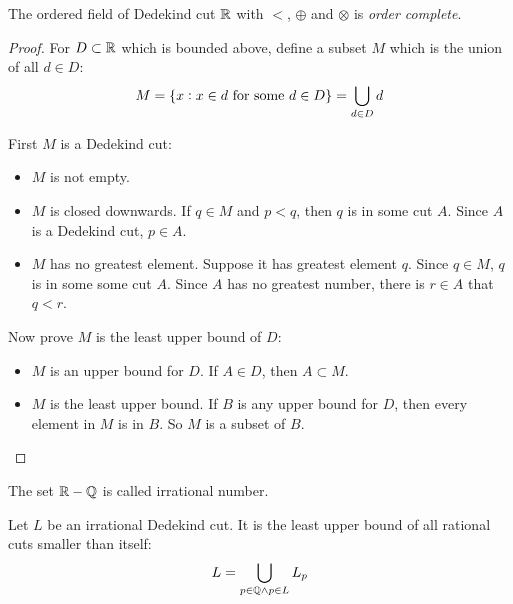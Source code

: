 \begin{theorem}\label{dedekind_real_order_complete}
    The ordered field of Dedekind cut $\mathbb{R}$ with $<$, $\oplus$ and $\otimes$  is \emph{order complete}.
\end{theorem}
\begin{proof}
    For $D \subset \mathbb{R}$ which is bounded above, define a subset $M$ which is the union of all $d \in D$:
    \begin{equation}
        M = \set{x: x \in d \text{ for some } d \in D} =\bigcup_{d \in D} d
    \end{equation}
    
    First $M$ is a Dedekind cut:
    \begin{itemize}
        \item $M$ is not empty.
        \item $M$ is closed downwards. If $q \in M$  and $p < q$, then $q$ is in some cut $A$. Since $A$ is a Dedekind cut, $p \in A$.
        \item $M$ has no greatest element. Suppose it has greatest element $q$. Since $q \in M$, $q$ is in some some cut $A$. Since $A$ has no greatest number, there is $r \in A$ that $q < r$.
    \end{itemize}
    
    Now prove $M$ is the least upper bound of $D$:
    \begin{itemize}
        \item $M$ is an upper bound for $D$. If $A \in D$, then $A \subset M$.
        \item $M$ is the least upper bound. If $B$ is any upper bound for $D$, then every element in $M$ is in $B$. So $M$ is a subset of $B$.
    \end{itemize}
\end{proof}

\begin{definition}
    The set $\mathbb{R} - \mathbb{Q}$ is called irrational number.
\end{definition}

\begin{theorem}
    Let $L$ be an irrational Dedekind cut. It is the least upper bound of all rational cuts smaller than itself:
    \begin{equation}
        L = \bigcup_{p \in \mathbb{Q} \wedge p \in L} L_p
    \end{equation}    
\end{theorem}


